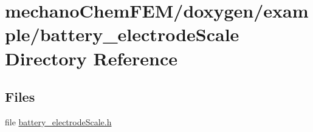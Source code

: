 \section{mechano\+Chem\+F\+E\+M/doxygen/example/battery\+\_\+electrode\+Scale Directory Reference}
\label{dir_35e2a5fb63f0e9effda426dcd3eefdd1}
\subsection*{Files}
\begin{DoxyCompactItemize}
\item 
file \mbox{\hyperlink{battery__electrode_scale_8h}{battery\+\_\+electrode\+Scale.\+h}}
\end{DoxyCompactItemize}
